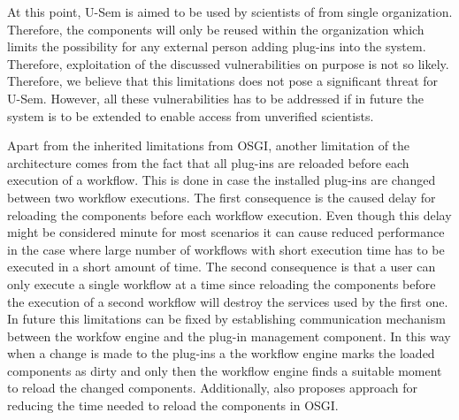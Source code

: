 At this point, U-Sem is aimed to be used by scientists of from single organization. Therefore, the components will only be reused within the organization which limits the possibility for any external person adding plug-ins into the system. Therefore, exploitation of the discussed vulnerabilities on purpose is not so likely. Therefore, we believe that this limitations does not pose a significant threat for U-Sem. However, all these vulnerabilities has to be addressed if in future the system is to be extended to enable access from unverified scientists. 

Apart from the inherited limitations from OSGI, another limitation of the architecture comes from the fact that all plug-ins are reloaded before each execution of a workflow. This is done in case the installed plug-ins are changed between two workflow executions. The first consequence is the caused delay for reloading the components before each workflow execution. Even though this delay might be considered minute for most scenarios it can cause reduced performance in the case where large number of workflows with short execution time has to be executed in a short amount of time. The second consequence is that a user can only execute a single workflow at a time since reloading the components before the execution of a second workflow will destroy the services used by the first one. In future this limitations can be fixed by establishing communication mechanism between the workfow engine and the plug-in management component. In this way when a change is made to the plug-ins a the workflow engine marks the loaded components as dirty and only then the workflow engine finds a suitable moment to reload the changed components. Additionally, \cite{Nikolov} also proposes approach for reducing the time needed to reload the components in OSGI.

